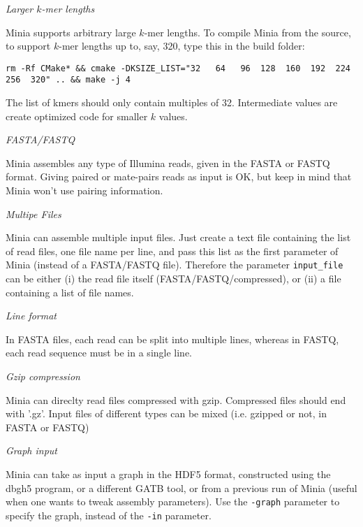 \documentclass[a4paper]{article}
\begin{document}
\begin{description}
\item \emph{Larger $k$-mer lengths}

Minia supports arbitrary large $k$-mer lengths. To compile Minia from the source, to support $k$-mer lengths up to, say, 320, type this in the build folder:
\begin{verbatim}
rm -Rf CMake* && cmake -DKSIZE_LIST="32   64   96  128  160  192  224  256  320" .. && make -j 4
\end{verbatim}

The list of kmers should only contain multiples of 32. Intermediate values are create optimized code for smaller $k$ values.

\item \emph{FASTA/FASTQ}

Minia assembles any type of Illumina reads, given in the FASTA or FASTQ format. Giving paired or mate-pairs reads as input is OK, but keep in mind that Minia won't use pairing information.
\item \emph{Multipe Files}

 Minia can assemble multiple input files. Just create a text file containing the list of read files, one file name per line, and pass this list as the first parameter of Minia (instead of a FASTA/FASTQ file). Therefore the parameter \verb+input_file+ can be either (i) the read file itself (FASTA/FASTQ/compressed), or (ii) a file containing a list of file names.

\item \emph{Line format}

 In FASTA files, each read can be split into multiple lines, whereas in FASTQ, each read sequence must be in a single line.

\item \emph{Gzip compression}

Minia can direclty read files compressed with gzip. Compressed files should end with '.gz'. Input files of different types can be mixed (i.e. gzipped or not, in FASTA or FASTQ)

\item \emph{Graph input}

Minia can take as input a graph in the HDF5 format, constructed using the dbgh5 program, or a different GATB tool, or from a previous run of Minia (useful when one wants to tweak assembly parameters). Use the \verb+-graph+ parameter to specify the graph, instead of the \verb+-in+ parameter.

\end{description}
\end{document}
